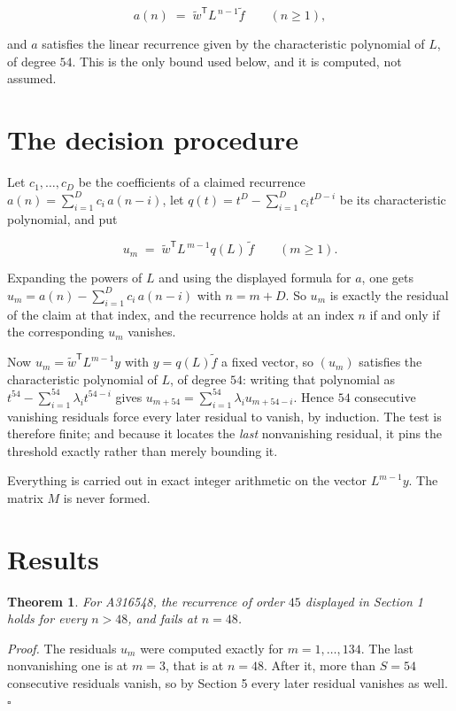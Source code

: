 \documentclass[11pt]{article}
\newtheorem{theorem}{Theorem}
\theoremstyle{definition}
\begin{document}
\[a(n) \;=\; \tilde w^{\mathsf T} L^{\,n-1} \tilde f \qquad (n \ge 1),\]

and $a$ satisfies the linear recurrence given by the characteristic polynomial of $L$, of degree $54$. This is the only bound used below, and it is computed, not assumed.

\section{The decision procedure}

Let $c_1,\dots,c_D$ be the coefficients of a claimed recurrence $a(n) = \sum_{i=1}^{D} c_i\,a(n-i)$, let $q(t) = t^{D} - \sum_{i=1}^{D} c_i t^{D-i}$ be its characteristic polynomial, and put

\[u_m \;=\; \tilde w^{\mathsf T} L^{\,m-1} q(L)\,\tilde f \qquad (m \ge 1).\]

Expanding the powers of $L$ and using the displayed formula for $a$, one gets $u_m = a(n) - \sum_{i=1}^{D} c_i\,a(n-i)$ with $n = m + D$. So $u_m$ is exactly the residual of the claim at that index, and the recurrence holds at an index $n$ if and only if the corresponding $u_m$ vanishes.

Now $u_m = \tilde w^{\mathsf T} L^{m-1} y$ with $y = q(L)\tilde f$ a fixed vector, so $(u_m)$ satisfies the characteristic polynomial of $L$, of degree $54$: writing that polynomial as $t^{54} - \sum_{i=1}^{54} \lambda_i t^{54-i}$ gives $u_{m+54} = \sum_{i=1}^{54} \lambda_i u_{m+54-i}$. Hence $54$ consecutive vanishing residuals force every later residual to vanish, by induction. The test is therefore finite; and because it locates the {\itshape last} nonvanishing residual, it pins the threshold exactly rather than merely bounding it.

Everything is carried out in exact integer arithmetic on the vector $L^{m-1}y$. The matrix $M$ is never formed.

\section{Results}

\begin{theorem} For A316548, the recurrence of order $45$ displayed in Section 1 holds for every $n > 48$, and fails at $n = 48$.\end{theorem}

{\itshape Proof.} The residuals $u_m$ were computed exactly for $m = 1,\dots,134$. The last nonvanishing one is at $m = 3$, that is at $n = 48$. After it, more than $S = 54$ consecutive residuals vanish, so by Section 5 every later residual vanishes as well. $\square$
\end{document}
